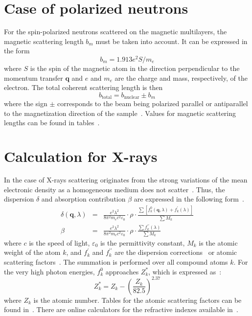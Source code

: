 \section{Case of polarized neutrons}

For the spin-polarized neutrons scattered on the magnetic multilayers, the magnetic scattering length $b_m$ must be taken into account. It can be expressed in the form~\cite{WiCa09}
\begin{equation}
b_m = 1.913e^2S/m_e
\end{equation}
where $S$ is the spin of the magnetic atom in the direction perpendicular to the momentum transfer $\mathbf{q}$ and $e$ and $m_e$ are the charge and mass, respectively, of the electron. The total coherent scattering length is then
\begin{equation}
b_{\text{total}} = b_{\text{nuclear}} \pm b_m
\end{equation}
where the sign $\pm$ corresponds to the beam being polarized parallel or antiparallel to the magnetization direction of the sample~\cite{WiCa09}. Values for magnetic scattering lengths can be found in tables~\cite{KoRS91,Sea92,RaWa00,Sea92online,RaWa00online}.

\section{Calculation for X-rays}

In the case of X-rays scattering originates from the strong variations of the mean electronic density as a homogeneous medium does not scatter~\cite{Mue09}. Thus, the dispersion $\delta$ and absorption contribution $\beta$ are expressed in the following form~\cite{Mue09}.
\begin{eqnarray}
\delta(\mathbf{q}, \lambda) &=& \frac{e^2\lambda^2}{8\pi^2m_e c^2 \varepsilon_0}\cdot \rho \cdot\frac{\sum{\left[f_k^0(\mathbf{q},\lambda) + f_k^{\prime}(\lambda)\right]}}{\sum{M_k}} \\
\beta &=&  \frac{e^2\lambda^2}{8\pi^2m_e c^2 \varepsilon_0}\cdot \rho \cdot\frac{\sum{f_k^{\prime\prime}(\lambda)}}{\sum{M_k}}
\end{eqnarray}
where $c$ is the speed of light, $\varepsilon_0$ is the permittivity constant, $M_k$ is the atomic weight of the atom $k$, and $f_k^{\prime}$ and $f_k^{\prime\prime}$ are the dispersion corrections~\cite{Mue09} or atomic scattering factors~\cite{HeGD93}. The summation is performed over all compound atoms $k$. For the very high photon energies, $f_k^0$ approaches $Z_k^*$, which is expressed as~\cite{HeGD93}:
\begin{equation}
Z_k^* = Z_k - \left(\frac{Z_k}{82.5}\right)^{2.37}
\end{equation}
where $Z_k$ is the atomic number. Tables for the atomic scattering factors can be found in~\cite{HeGD93}. There are online calculators for the refractive indexes available in~\cite{HeGD93online}.
